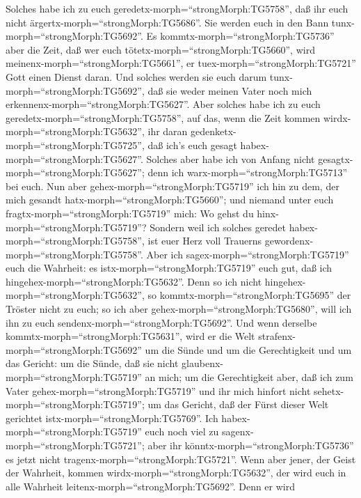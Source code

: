 Solches habe ich zu euch
geredetx-morph=``strongMorph:TG5758'', daß ihr euch nicht
ärgertx-morph=``strongMorph:TG5686''.  Sie werden euch in
den Bann tunx-morph=``strongMorph:TG5692''. Es
kommtx-morph=``strongMorph:TG5736'' aber die Zeit, daß wer euch
tötetx-morph=``strongMorph:TG5660'', wird
meinenx-morph=``strongMorph:TG5661'', er
tuex-morph=``strongMorph:TG5721'' Gott einen Dienst daran. 
Und solches werden sie euch darum tunx-morph=``strongMorph:TG5692'', daß
sie weder meinen Vater noch mich erkennenx-morph=``strongMorph:TG5627''.
 Aber solches habe ich zu euch
geredetx-morph=``strongMorph:TG5758'', auf das, wenn die Zeit kommen
wirdx-morph=``strongMorph:TG5632'', ihr daran
gedenketx-morph=``strongMorph:TG5725'', daß ich's euch gesagt
habex-morph=``strongMorph:TG5627''. Solches aber habe ich von Anfang
nicht gesagtx-morph=``strongMorph:TG5627''; denn ich
warx-morph=``strongMorph:TG5713'' bei euch.  Nun aber
gehex-morph=``strongMorph:TG5719'' ich hin zu dem, der mich gesandt
hatx-morph=``strongMorph:TG5660''; und niemand unter euch
fragtx-morph=``strongMorph:TG5719'' mich: Wo gehst du
hinx-morph=``strongMorph:TG5719''?  Sondern weil ich solches
geredet habex-morph=``strongMorph:TG5758'', ist euer Herz voll Trauerns
gewordenx-morph=``strongMorph:TG5758''.  Aber ich
sagex-morph=``strongMorph:TG5719'' euch die Wahrheit: es
istx-morph=``strongMorph:TG5719'' euch gut, daß ich
hingehex-morph=``strongMorph:TG5632''. Denn so ich nicht
hingehex-morph=``strongMorph:TG5632'', so
kommtx-morph=``strongMorph:TG5695'' der Tröster nicht zu euch; so ich
aber gehex-morph=``strongMorph:TG5680'', will ich ihn zu euch
sendenx-morph=``strongMorph:TG5692''.  Und wenn derselbe
kommtx-morph=``strongMorph:TG5631'', wird er die Welt
strafenx-morph=``strongMorph:TG5692'' um die Sünde und um die
Gerechtigkeit und um das Gericht:  um die Sünde, daß sie
nicht glaubenx-morph=``strongMorph:TG5719'' an mich;  um
die Gerechtigkeit aber, daß ich zum Vater
gehex-morph=``strongMorph:TG5719'' und ihr mich hinfort nicht
sehetx-morph=``strongMorph:TG5719'';  um das Gericht, daß
der Fürst dieser Welt gerichtet istx-morph=``strongMorph:TG5769''.
 Ich habex-morph=``strongMorph:TG5719'' euch noch viel zu
sagenx-morph=``strongMorph:TG5721''; aber ihr
könntx-morph=``strongMorph:TG5736'' es jetzt nicht
tragenx-morph=``strongMorph:TG5721''.  Wenn aber jener, der
Geist der Wahrheit, kommen wirdx-morph=``strongMorph:TG5632'', der wird
euch in alle Wahrheit leitenx-morph=``strongMorph:TG5692''. Denn er wird
